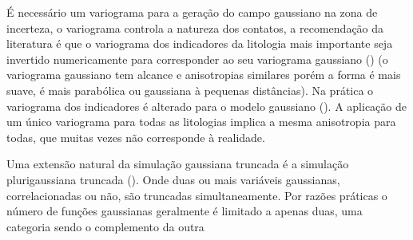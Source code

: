 É necessário um variograma para a geração do campo gaussiano na zona de incerteza, o variograma controla a natureza dos contatos, a recomendação da literatura é que o variograma dos indicadores da litologia mais importante seja invertido numericamente para corresponder ao seu variograma gaussiano (\cite{journel2004evaluation}) (o variograma gaussiano tem alcance e anisotropias similares  porém a forma é mais suave, é mais parabólica ou gaussiana à pequenas distâncias). Na prática o variograma dos indicadores é alterado para o modelo gaussiano (\cite{pyrcz2014geostatistical}). A aplicação de um único variograma para todas as litologias implica a mesma anisotropia para todas, que muitas vezes não corresponde à realidade. 

Uma extensão natural da simulação gaussiana truncada é a simulação plurigaussiana truncada (\cite{galli1994pros}). Onde duas ou mais variáveis gaussianas, correlacionadas ou não, são truncadas simultaneamente. Por razões práticas o número de funções gaussianas geralmente é limitado a apenas duas, uma categoria sendo o complemento da outra \cite{rossi2013mineral}